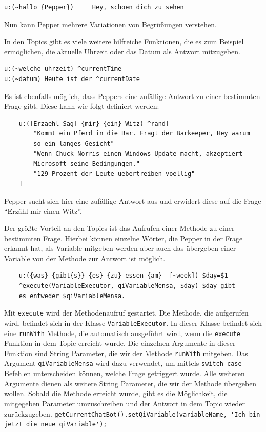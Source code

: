 \begin{lstlisting}
u:(~hallo {Pepper}) 	Hey, schoen dich zu sehen
\end{lstlisting}

Nun kann Pepper mehrere Variationen von Begrüßungen verstehen.

In den Topics gibt es viele weitere hilfreiche Funktionen, die es zum Beispiel ermöglichen, die aktuelle Uhrzeit oder das Datum als Antwort 
mitzugeben. \\

\begin{lstlisting}
u:(~welche-uhrzeit) ^currentTime
u:(~datum) Heute ist der ^currentDate
\end{lstlisting}

Es ist ebenfalls möglich, dass Peppers eine zufällige Antwort zu einer bestimmten Frage gibt. Diese kann wie folgt definiert werden:\\

\begin{lstlisting}
    u:([Erzaehl Sag] {mir} {ein} Witz) ^rand[
        "Kommt ein Pferd in die Bar. Fragt der Barkeeper, Hey warum 
        so ein langes Gesicht"
        "Wenn Chuck Norris einen Windows Update macht, akzeptiert 
        Microsoft seine Bedingungen."
        "129 Prozent der Leute uebertreiben voellig"
    ]
\end{lstlisting}

Pepper sucht sich hier eine zufällige Antwort aus und erwidert diese auf die Frage ``Erzähl mir einen Witz''. 

Der größte Vorteil an den Topics ist das Aufrufen einer Methode zu einer bestimmten Frage. 
Hierbei können einzelne Wörter, die Pepper in der Frage erkannt hat, als Variable mitgeben werden aber auch das übergeben einer Variable von 
der Methode zur Antwort ist möglich.\\

\begin{lstlisting}
    u:({was} {gibt{s}} {es} {zu} essen {am} _[~week]) $day=$1 
    ^execute(VariableExecutor, qiVariableMensa, $day) $day gibt 
    es entweder $qiVariableMensa.
\end{lstlisting}

Mit \verb|execute| wird der Methodenaufruf gestartet. Die Methode, die aufgerufen wird, befindet sich in der Klasse \verb|VariableExecutor|.  In dieser Klasse befindet sich eine \verb|runWith| Methode, die automatisch ausgeführt wird, wenn die \verb|execute| Funktion in dem Topic  erreicht wurde. Die einzelnen Argumente in dieser Funktion sind String Parameter, die wir der Methode \verb|runWith| mitgeben. Das Argument \verb|qiVariableMensa| wird dazu verwendet, um mittels \verb|switch case| Befehlen unterscheiden können, welche Frage getriggert wurde. Alle weiteren Argumente dienen als weitere String Parameter, die wir der Methode übergeben wollen. Sobald die Methode erreicht wurde, gibt es die Möglichkeit, die mitgegeben Parameter umzuschreiben und der Antwort in dem Topic wieder zurückzugeben. \verb|getCurrentChatBot().setQiVariable(variableName, 'Ich bin jetzt die neue qiVariable');|%

